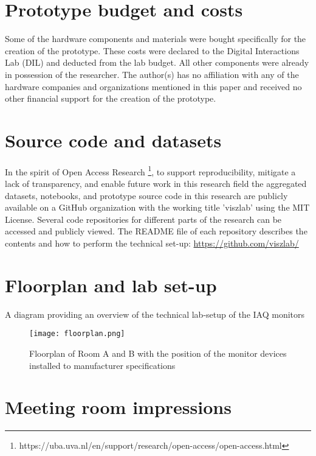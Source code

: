 \begin{appendices}
\section{Prototype budget and costs}
\label{appendix:ethical}

Some of the hardware components and materials were bought specifically for the creation of the prototype. These costs were declared to the Digital Interactions Lab (DIL) and deducted from the lab budget. All other components were already in possession of the researcher. The author(s) has no affiliation with any of the hardware companies and organizations mentioned in this paper and received no other financial support for the creation of the prototype.

\section{Source code and datasets}
\label{appendix:source}

In the spirit of Open Access Research \footnote{https://uba.uva.nl/en/support/research/open-access/open-access.html}, to support reproducibility, mitigate a lack of transparency, and enable future work in this research field the aggregated datasets, notebooks, and prototype source code in this research are publicly available on a GitHub organization with the working title 'viszlab' using the MIT License. Several code repositories for different parts of the research can be accessed and publicly viewed. The README file of each repository describes the contents and how to perform the technical set-up: \underline{https://github.com/viszlab/}

\pagebreak

\section{Floorplan and lab set-up}
\label{appendix:floorplan}

A diagram providing an overview of the technical lab-setup of the IAQ monitors

\begin{figure}[H]
    \centering
    \texttt{[image: floorplan.png]}
    \caption{Floorplan of Room A and B with the position of the monitor devices installed to manufacturer specifications}
    \label{fig:timeline}
\end{figure}

\section{Meeting room impressions}
\label{appendix:meetings}


\end{appendices}
